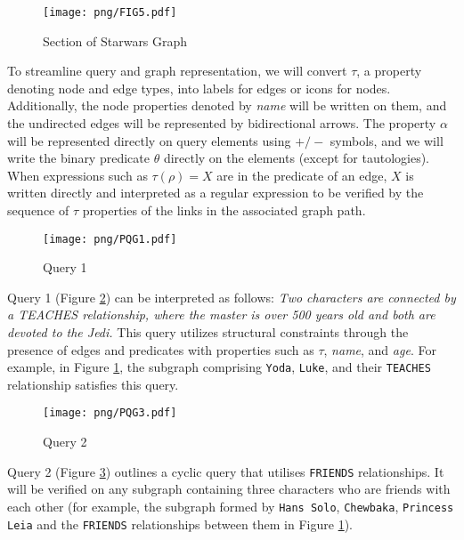 \documentclass{article}%
\begin{document}
\begin{figure}[h!]
    \begin{center}
        \texttt{[image: png/FIG5.pdf]}
    \end{center}
    \caption{%
        Section of Starwars Graph
    }%
    \label{starwars}
\end{figure}

To streamline query and graph representation, we will convert $\tau$, a property denoting node and edge types, into labels for edges or icons for nodes. Additionally, the node properties denoted by \textit{name} will be written on them, and the undirected edges will be represented by bidirectional arrows. The property $\alpha$ will be represented directly on query elements using $+ / -$ symbols, and we will write the binary predicate $\theta$ directly on the elements (except for tautologies). When expressions such as $\tau (\rho) = X$ are in the predicate of an edge, $X$ is written directly and interpreted as a regular expression to be verified by the sequence of $\tau$ properties of the links in the associated graph path. 

\begin{figure}[h!]
    \begin{center}
        \texttt{[image: png/PQG1.pdf]}
    \end{center}
    \caption{%
        Query 1
    }%
    \label{pqg1}
\end{figure}

Query 1 (Figure \ref{pqg1}) can be interpreted as follows: \textit{Two characters are connected by a \textit{TEACHES} relationship, where the master is over 500 years old and both are devoted to the Jedi.} This query utilizes structural constraints through the presence of edges and predicates with properties such as $ \tau $, \textit{name}, and \textit{age}. For example, in Figure \ref{starwars}, the subgraph comprising \texttt{Yoda}, \texttt{Luke}, and their \texttt{TEACHES} relationship satisfies this query. 

\begin{figure}[h]
    \begin{center}
        \texttt{[image: png/PQG3.pdf]}
    \end{center}
    \caption{%
      Query 2
    }%
    \label{pqg3}
\end{figure}

Query 2 (Figure \ref{pqg3}) outlines a cyclic query that utilises \texttt{FRIENDS} relationships. It will be verified on any subgraph containing three characters who are friends with each other (for example, the subgraph formed by \texttt{Hans Solo}, \texttt{Chewbaka}, \texttt{Princess Leia} and the \texttt{FRIENDS} relationships between them in Figure \ref{starwars}).
\end{document}
